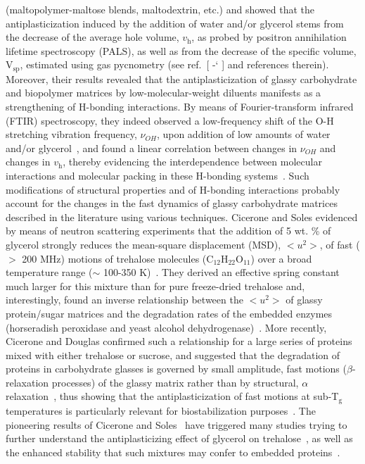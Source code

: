 \documentclass[journal=jpcbfk,manuscript=article]{achemso}
\newcommand*{\citen}[1]{%
\begingroup
\romannumeral-`\x %
\setcitestyle{numbers}%
\cite{#1}%
\endgroup   
}
\begin{document}
\begin{singlespacing}
(maltopolymer-maltose blends, maltodextrin, etc.) and showed that the antiplasticization induced by the addition of water 
and/or glycerol stems from the decrease of the average hole volume, $v_{\textrm{h}}$, 
as probed by positron annihilation lifetime spectroscopy (PALS), as well as from the decrease of the specific volume, V$_{\textrm{sp}}$, 
estimated using gas pycnometry (see ref.~[\citen{Ubbink2016}] and references therein). 
Moreover, their results revealed that the antiplasticization of glassy carbohydrate and biopolymer matrices 
by low-molecular-weight diluents manifests as a strengthening of H-bonding interactions. By means of Fourier-transform infrared (FTIR) 
spectroscopy, they indeed observed a low-frequency shift of the O-H stretching vibration frequency, $\nu_{OH}$, upon addition of 
low amounts of water and/or glycerol~\cite{Roussenova2014,Ubbink2016}, and found a linear correlation between changes 
in $\nu_{OH}$ and changes in $v_{\textrm{h}}$, thereby evidencing the interdependence between molecular interactions and molecular 
packing in these H-bonding systems~\cite{Ubbink2016}.
Such modifications of structural properties and of H-bonding interactions probably account for the changes
in the fast dynamics of glassy carbohydrate matrices described in the literature 
using various techniques. Cicerone and Soles evidenced by means of neutron scattering experiments that the addition of 5 wt. \% of glycerol 
strongly reduces the mean-square displacement (MSD), $<u^{\textrm{2}}>$, of fast ($>$ 200 MHz) motions of 
trehalose molecules (C$_{\textrm{12}}$H$_{\textrm{22}}$O$_{\textrm{11}}$) over a broad temperature range 
($\sim$ 100-350 K)~\cite{Cicerone2004}. They derived an effective 
spring constant much larger for this mixture than for pure freeze-dried trehalose and, interestingly, found an inverse 
relationship between the $<u^{\textrm{2}}>$ of glassy protein/sugar matrices and the degradation rates of the embedded
enzymes (horseradish peroxidase and yeast alcohol dehydrogenase)~\cite{Cicerone2004}. More recently, Cicerone and Douglas 
confirmed such a relationship for a large series of proteins mixed with either trehalose or sucrose, and suggested that 
the degradation of proteins in carbohydrate glasses is governed by small amplitude, fast motions ($\beta$-relaxation 
processes) of the glassy matrix rather than by structural, $\alpha$ relaxation~\cite{Cicerone2012}, thus 
showing that the antiplasticization of fast motions at sub-T$_{\textrm{g}}$ temperatures is particularly relevant for 
biostabilization purposes~\cite{Cicerone2012,Ubbink2016}. 
The pioneering results of Cicerone and Soles~\cite{Cicerone2004} have triggered many studies trying to further
understand the antiplasticizing effect of glycerol on 
trehalose~\cite{Dirama2005,Anopchenko2006,Riggleman2008,Magazu2010,Obrzut2010,Averett2012,Weng2015}, 
as well as the enhanced stability that 
such mixtures may confer to embedded proteins~\cite{Curtis2006,Cicerone2012,Barreca2013,Bellavia2014}.


\end{singlespacing}
\end{document}
